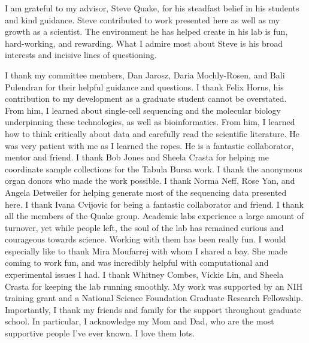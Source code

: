 
I am grateful to my advisor, Steve Quake, for his steadfast belief in his students and kind guidance.
Steve contributed to work presented here as well as my growth as a scientist. The environment he has helped create in his lab is fun, hard-working, and rewarding. What I admire most about Steve is his broad interests and incisive lines of questioning.

I thank my committee members, Dan Jarosz, Daria Mochly-Rosen, and Bali Pulendran for their helpful guidance and questions.
I thank Felix Horns, his contribution to my development as a graduate student cannot be overstated. From him, I learned about single-cell sequencing and the molecular biology underpinning these technologies, as well as bioinformatics. From him, I learned how to think critically about data and carefully read the scientific literature. He was very patient with me as I learned the ropes. He is a fantastic collaborator, mentor and friend.  I thank Bob Jones and Sheela Crasta for helping me coordinate sample collections for the Tabula Bursa work. I thank the anonymous organ donors who made the work possible. 
I thank Norma Neff, Rose Yan, and Angela Detweiler for helping generate most of the sequencing data presented here. I thank Ivana Cvijovic for being a fantastic collaborator and friend. I thank all the members of the Quake group. Academic labs experience a large amount of turnover, yet while people left, the soul of the lab has remained curious and courageous towards science. Working with them has been really fun. I would especially like to thank Mira Moufarrej with whom I shared a bay. She made coming to work fun, and was incredibly helpful with computational and experimental issues I had. 
I thank Whitney Combes, Vickie Lin, and Sheela Crasta for keeping the lab running smoothly.
My work was supported by an NIH training grant and a National Science Foundation Graduate Research Fellowship. Importantly, I thank my friends and family for the support throughout graduate school. In particular, I acknowledge my Mom and Dad, who are the most supportive people I've ever known. I love them lots.